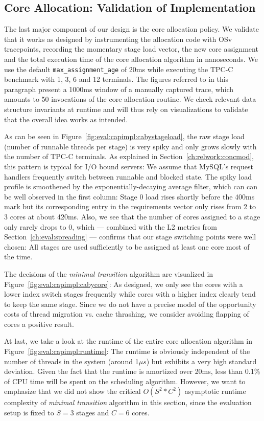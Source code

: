 \documentclass[12pt,a4paper]{book}
\begin{document}
\clearpage
\subsection{Core Allocation: Validation of Implementation}\label{ch:eval:polidea}

The last major component of our design is the core allocation policy.
We validate that it works as designed by instrumenting the allocation code with OSv tracepoints, recording the momentary stage load vector, the new core assignment and the total execution time of the core allocation algorithm in nanoseconds.
We use the default \lstinline[style=figurecpp]{max_assignment_age} of 20ms while executing the TPC-C benchmark with 1, 3, 6 and 12 terminals.
The figures referred to in this paragraph present a 1000ms window of a manually captured trace, which amounts to 50 invocations of the core allocation routine.
We check relevant data structure invariants at runtime and will thus rely on visualizations to validate that the overall idea works as intended.

As can be seen in Figure~\ref{fig:eval:capimpl:cabystageload}, the raw stage load (number of runnable threads per stage) is very spiky and only grows slowly with the number of TPC-C terminals.
As explained in Section~\ref{ch:relwork:concmod}, this pattern is typical for I/O bound servers:
We assume that MySQL's request handlers frequently switch between runnable and blocked state.
The spiky load profile is smoothened by the exponentially-decaying average filter, which can can be well observed in the first column:
Stage 0 load rises shortly before the 400ms mark but its corresponding entry in the requirements vector only rises from 2 to 3 cores at about 420ms.
Also, we see that the number of cores assigned to a stage only rarely drops to 0, which --- combined with the L2 metrics from Section~\ref{ch:eval:spreading} --- confirms that our stage switching points were well chosen:
All stages are used sufficiently to be assigned at least one core most of the time.

The decisions of the \emph{minimal transition} algorithm are visualized in Figure~\ref{fig:eval:capimpl:cabycore}:
As designed, we only see the cores with a lower index switch stages frequently while cores with a higher index clearly tend to keep the same stage.
Since we do not have a precise model of the opportunity costs of thread migration vs. cache thrashing, we consider avoiding flapping of cores a positive result.

At last, we take a look at the runtime of the entire core allocation algorithm in Figure~\ref{fig:eval:capimpl:runtime}:
The runtime is obviously independent of the number of threads in the system (around 1$\mu s$) but exhibits a very high standard deviation.
Given the fact that the runtime is amortized over 20ms, less than 0.1\% of CPU time will be spent on the scheduling algorithm.
However, we want to emphasize that we did not show the critical $O(S^2 * C^2)$ asymptotic runtime complexity of \emph{minimal transition} algorithm in this section, since the evaluation setup is fixed to $S = 3$ stages and $C = 6$ cores.
\end{document}
